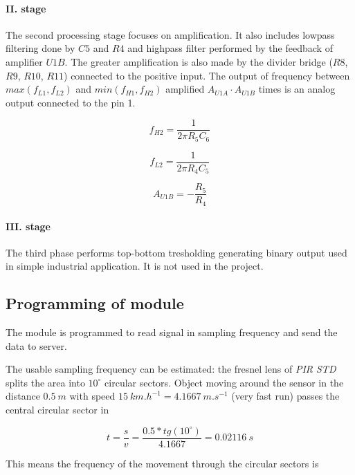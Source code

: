 \paragraph{II. stage}
The second processing stage focuses on amplification. It also includes lowpass filtering done
by $C5$ and $R4$ and highpass filter performed by the feedback of amplifier $U1B$. The greater
amplification is also made by the divider bridge ($R8$, $R9$, $R10$, $R11$) connected to the
positive input. The output of frequency between $max(f_{L1}, f_{L2})$ and $min(f_{H1}, f_{H2})$
amplified $A_{U1A} \cdot A_{U1B}$ times is an analog output connected to the pin 1.

\begin{equation}
f_{H2} = \frac{1}{2 \pi R_5 C_6}
\end{equation}

\begin{equation}
f_{L2} = \frac{1}{2 \pi R_4 C_5}
\end{equation}

\begin{equation}
A_{U1B} = -\frac{R_5}{R_4}
\end{equation}

\paragraph{III. stage}
The third phase performs top-bottom tresholding generating binary output
used in simple industrial application. It is not used in the project.\cite{PIRSchemeDescription}

\subsection*{Programming of module}
The module is programmed to read signal in sampling frequency and send the data to server.

The usable sampling frequency can be estimated: the fresnel lens of {\it PIR STD} splits the
area into $10^{\circ}$ circular sectors. Object moving around the sensor in the distance $0.5~m$
with speed $15~km.h^{-1} = 4.1667~m.s^{-1}$ (very fast run) passes the central circular sector in

\begin{equation}
t = \frac{s}{v} = \frac{0.5*tg(10^{\circ})}{4.1667} = 0.02116~s
\end{equation}

This means the frequency of the movement through the circular sectors is

